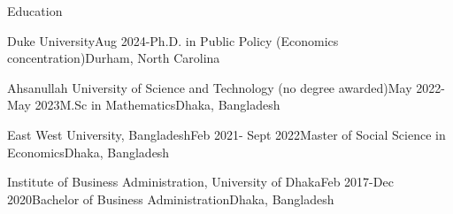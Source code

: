 \documentclass[
	11pt, %
]{resume} %
\begin{document}

\begin{rSection}{Education}
	\singlesspacing
	\begin{rSubsection}{Duke University}{Aug 2024-}{Ph.D. in Public Policy (Economics concentration)}{Durham, North Carolina}
	\end{rSubsection}
	\begin{rSubsection}{Ahsanullah University of Science and Technology (no degree awarded)}{May 2022-May 2023}{M.Sc in Mathematics}{Dhaka, Bangladesh}
	\end{rSubsection}	

	\begin{rSubsection}{East West University, Bangladesh}{Feb 2021- Sept 2022}{Master of Social Science in Economics}{Dhaka, Bangladesh}
	\end{rSubsection}

	\begin{rSubsection}{Institute of Business Administration, University of Dhaka}{Feb 2017-Dec 2020}{Bachelor of Business Administration}{Dhaka, Bangladesh}
	\end{rSubsection}		

	
\end{rSection}
\end{document}
